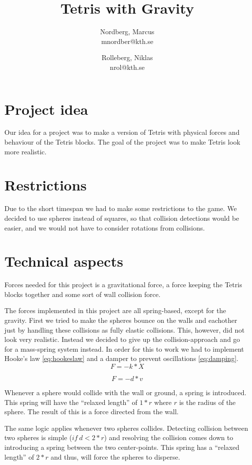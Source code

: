 \documentclass[11pt]{article} %
\title{Tetris with Gravity}
\author{Nordberg, Marcus \\ mnordber@kth.se
		\and
	Rolleberg, Niklas \\ nrol@kth.se}
\begin{document}
\maketitle

\section{Project idea}
Our idea for a project was to make a version of Tetris with physical forces and behaviour of the Tetris blocks. The goal of the project was to make Tetris look more realistic. 

\section{Restrictions}
Due to the short timespan we had to make some restrictions to the game. We decided to use spheres instead of squares, so that collision detections would be easier, and we would not have to consider rotations from collisions.

\section{Technical aspects}
Forces needed for this project is a gravitational force, a force keeping the Tetris blocks together and some sort of wall collision force.

The forces implemented in this project are all spring-based, except for the gravity. First we tried to make the spheres bounce on the walls and eachother just by handling these collisions as fully elastic collisions. This, however, did not look very realistic. Instead we decided to give up the collision-approach and go for a mass-spring system instead. In order for this to work we had to implement Hooke's law \eqref{eq:hookeslaw} and a damper to prevent oscillations \eqref{eq:damping}.
\begin{equation}
	\label{eq:hookeslaw}
       F = -k*X
\end{equation}

\begin{equation}
	\label{eq:damping}
       F = -d*v
\end{equation}

Whenever a sphere would collide with the wall or ground, a spring is introduced. This spring will have the ``relaxed length'' of $1 * r$ where $r$ is the radius of the sphere. The result of this is a force directed from the wall.

The same logic applies whenever two spheres collides. Detecting collision between two spheres is simple ($if~d < 2 * r$) and resolving the collision comes down to introducing a spring between the two center-points. This spring has a ``relaxed length'' of $2 * r$ and thus, will force the spheres to disperse.
\end{document}

